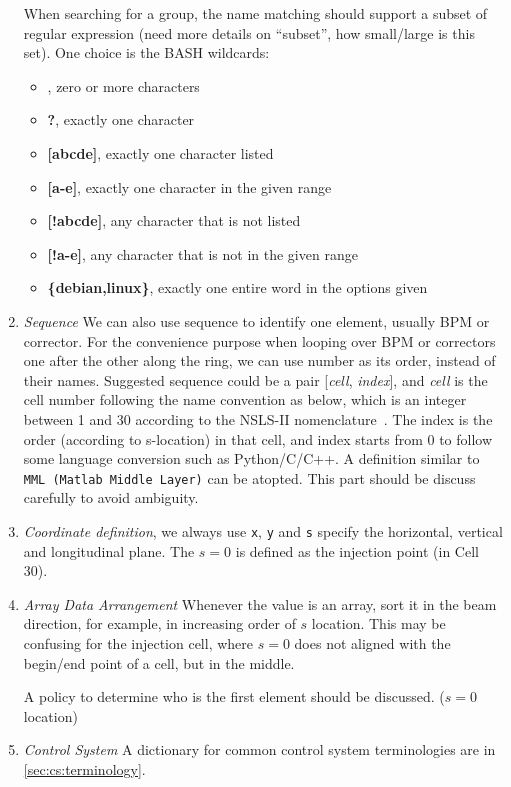 \documentclass[letterpaper,showtrims]{memoir}
\newcommand{\code}[1]{\texttt{#1}}
\newcommand{\strong}[1]{{\bfseries #1}}
\begin{document}
\begin{enumerate}
   When searching for a group, the name matching should
  support a subset of regular expression (need more details on ``subset'',
  how small/large is this set). One choice is the BASH wildcards:
  \begin{itemize}
  \item \strong{*}, zero or more characters
  \item \strong{?}, exactly one character
  \item \strong{[abcde]}, exactly one character listed
  \item \strong{[a-e]}, exactly one character in the given range
  \item \strong{[!abcde]}, any character that is not listed
  \item \strong{[!a-e]}, any character that is not in the given range
  \item \strong{\{debian,linux\}}, exactly one entire word in the options
    given
  \end{itemize}
\item \emph{Sequence} We can also use sequence to identify
  one element, usually BPM or corrector. For the convenience purpose when
  looping over BPM or correctors one after the other along the ring, we
  can use number as its order, instead of their names. Suggested sequence
  could be a pair [\emph{cell}, \emph{index}], and \emph{cell} is the cell
  number following the name convention as below, which is an integer
  between 1 and 30 according to the NSLS-II
  nomenclature~\cite{lt_2008_nomenclature,lt_2009_nomenclature}. The index
  is the order (according to s-location) in that cell, and index starts
  from 0 to follow some language conversion such as Python/C/C++. A
  definition similar to \code{MML (Matlab Middle Layer)} can be
  atopted. This part should be discuss carefully to avoid ambiguity.
   
\item \emph{Coordinate definition}, we always use \code{x}, \code{y} and
  \code{s} specify the horizontal, vertical and longitudinal plane. The
  $s=0$ is defined as the injection point (in Cell 30).
\item \emph{Array Data Arrangement} Whenever the value is an
  array, sort it in the beam direction, for example, in increasing order
  of $s$ location. This may be confusing for the injection cell, where
  $s=0$ does not aligned with the begin/end point of a cell, but in the
  middle.

  A policy to determine who is the first element should be
  discussed. ($s=0$ location)

\item \emph{Control System} A dictionary for common control system
  terminologies are in \ref{sec:cs:terminology}.
\end{enumerate}
\end{document}
